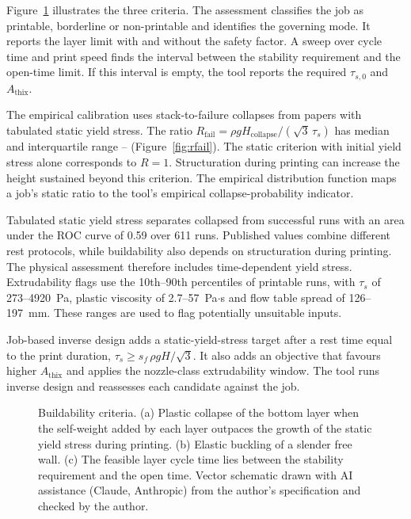\documentclass[preprint,12pt]{elsarticle}
\newcommand{\aidisclosure}{Vector schematic drawn with AI assistance (Claude, Anthropic) from the author's specification and checked by the author.}
\begin{document}
Figure~\ref{fig:criteria} illustrates the three criteria. The assessment classifies the job as printable, borderline or non-printable and identifies the governing mode. It reports the layer limit with and without the safety factor. A sweep over cycle time and print speed finds the interval between the stability requirement and the open-time limit. If this interval is empty, the tool reports the required $\tau_{s,0}$ and $A_{\mathrm{thix}}$.

The empirical calibration uses \nrFailN{} stack-to-failure collapses from \nrFailPapers{} papers with tabulated static yield stress. The ratio $R_{\mathrm{fail}} = \rho g H_{\mathrm{collapse}} / (\sqrt{3}\,\tau_s)$ has median \nrFailMedian{} and interquartile range \nrFailPtf{}--\nrFailPsf{} (Figure~\ref{fig:rfail}). The static criterion with initial yield stress alone corresponds to $R = 1$. Structuration during printing can increase the height sustained beyond this criterion. The empirical distribution function maps a job's static ratio to the tool's empirical collapse-probability indicator.

Tabulated static yield stress separates collapsed from successful runs with an area under the ROC curve of 0.59 over 611 runs. Published values combine different rest protocols, while buildability also depends on structuration during printing. The physical assessment therefore includes time-dependent yield stress. Extrudability flags use the 10th--90th percentiles of printable runs, with $\tau_s$ of 273--4920~Pa, plastic viscosity of 2.7--57~Pa$\cdot$s and flow table spread of 126--197~mm. These ranges are used to flag potentially unsuitable inputs.

Job-based inverse design adds a static-yield-stress target after a rest time equal to the print duration, $\tau_s \ge s_f\,\rho g H / \sqrt{3}$. It also adds an objective that favours higher $A_{\mathrm{thix}}$ and applies the nozzle-class extrudability window. The tool runs inverse design and reassesses each candidate against the job.

\begin{figure}[t]
\centering
\resizebox{\textwidth}{!}{}
\caption{Buildability criteria. (a) Plastic collapse of the bottom layer when the self-weight added by each layer outpaces the growth of the static yield stress during printing. (b) Elastic buckling of a slender free wall. (c) The feasible layer cycle time lies between the stability requirement and the open time. \aidisclosure}
\label{fig:criteria}
\end{figure}
\end{document}
